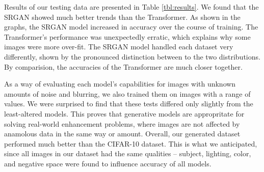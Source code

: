 \documentclass[letterpaper]{article} %
\begin{document}
Results of our testing data are presented in Table \ref{tbl:results}.
We found that the SRGAN showed much better trends than the Transformer.
As shown in the graphs, the SRGAN model increased in accuracy over the course of training.
The Transformer's performance was unexpectedly erratic, which explains why some images were more over-fit.
The SRGAN model handled each dataset very differently,
shown by the pronounced distinction between to the two distributions.
By comparision, the accuracies of the Transformer are much closer together.

As a way of evaluating each model's capabilities for images with unknown amounts of
noise and blurring, we also trained them on images with a range of values.
We were surprised to find that these tests differed only slightly from the least-altered models.
This proves that generative models are appropritate for solving real-world enhancement
problems, where images are not affected by anamolous data in the same way or amount.
Overall, our generated dataset performed much better than the CIFAR-10 dataset.
This is what we anticipated, since all images in our dataset had the same qualities --
subject, lighting, color, and negative space were found to influence accuracy of all models.
\end{document}
